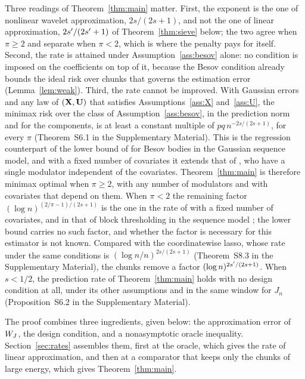Three readings of Theorem~\ref{thm:main} matter. First, the exponent is the
one of nonlinear wavelet approximation, $2s/(2s+1)$, and not the one of
linear approximation, $2s'/(2s'+1)$ of Theorem~\ref{thm:sieve} below; the two
agree when $\pi \ge 2$ and separate when $\pi < 2$, which is where the
 penalty pays for itself. Second, the rate is attained under
Assumption~\ref{ass:besov} alone:  no condition is imposed
on the coefficients on top of it, because the Besov condition already bounds
the ideal risk over chunks that governs the estimation error
(Lemma~\ref{lem:weak}). 
Third,  the rate
cannot be improved. With Gaussian errors and any law of $(\mathbf{X},\mathbf{U})$ that
satisfies Assumptions~\ref{ass:X} and~\ref{ass:U}, the minimax risk over the
class of Assumption~\ref{ass:besov}, in the prediction norm and for the
components, is at least a constant multiple of $pq\,n^{-2s/(2s+1)}$, for every
$\pi$ (Theorem~S6.1 in the Supplementary Material). This is the regression
counterpart of the lower bound of \citet[Theorem~5]{Donoho-Johnstone-1998} for
Besov bodies in the Gaussian sequence model, and with a fixed number of
covariates it extends that of \citet[Theorem~1]{Klopp-Pensky-2015}, who have a
single modulator independent of the covariates. Theorem~\ref{thm:main} is
therefore minimax optimal when $\pi \ge 2$, with any number of modulators and
with covariates that depend on them. When
$\pi < 2$ the remaining factor $(\log n)^{(2/\pi-1)/(2s+1)}$ is the one in the
rate of \citet[eq.~3.19]{Klopp-Pensky-2015} with a fixed number of covariates,
and in that of block thresholding in the sequence model
\citep[Theorem~4]{Cai-1999};  the lower bound carries
no such factor, and whether the factor is necessary for this estimator is not
known. Compared with the
coordinatewise lasso, whose rate under the same conditions is
$(\log n/n)^{2s/(2s+1)}$ (Theorem~S8.3 in the Supplementary Material), the
chunks remove a factor $(\log n)^{2s'/(2s+1)}$.
 When $s < 1/2$, the prediction
rate of Theorem~\ref{thm:main} holds with no design condition at all, under
its other assumptions and in the same window for $J_{n}$ (Proposition~S6.2
in the Supplementary Material).

The proof combines three ingredients, given below: the approximation error of
$W_{J}$, the design condition, and a nonasymptotic oracle inequality.
Section~\ref{sec:rates} assembles them, first at the oracle, which gives the rate of linear approximation, and then at a
comparator that keeps only the chunks of large energy,
which gives Theorem~\ref{thm:main}.

